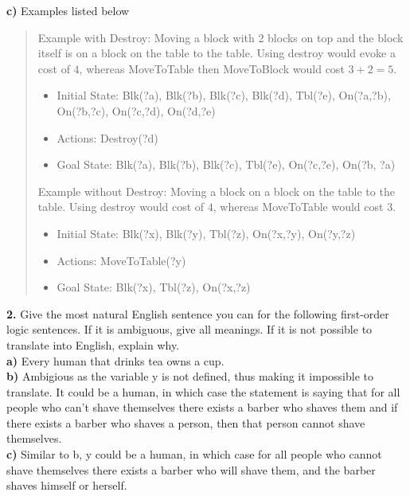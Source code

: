 \documentclass[titlepage]{article}
\begin{document}
\newpage

\textbf{c) } Examples listed below

\begin{quote}
	Example with Destroy: Moving a block with 2 blocks on top and the block itself is on a block on the table to the table. Using destroy would evoke a cost of $4$, whereas MoveToTable then MoveToBlock would cost $3+2=5$.
	\begin{itemize}
		\item Initial State: Blk(?a), Blk(?b), Blk(?c), Blk(?d), Tbl(?e), On(?a,?b), On(?b,?c), On(?c,?d), On(?d,?e)
		\item Actions: Destroy(?d)
		\item Goal State: Blk(?a), Blk(?b), Blk(?c), Tbl(?e), On(?c,?e), On(?b, ?a)
	\end{itemize}

	Example without Destroy: Moving a block on a block on the table to the table. Using destroy would cost of $4$, whereas MoveToTable would cost $3$.
	\begin{itemize}
		\item Initial State: Blk(?x), Blk(?y), Tbl(?z), On(?x,?y), On(?y,?z)
		\item Actions: MoveToTable(?y)
		\item Goal State: Blk(?x), Tbl(?z), On(?x,?z)
	\end{itemize}
\end{quote}

\noindent \textbf{2. } Give the most natural English sentence you can for the following first-order logic sentences. If it is ambiguous, give all meanings. If it is not possible to translate into English, explain why.\\

\textbf{a) } Every human that drinks tea owns a cup.\\

\textbf{b) } Ambigious as the variable y is not defined, thus making it impossible to translate. It could be a human, in which case the statement is saying that for all people who can't shave themselves there exists a barber who shaves them and if there exists a barber who shaves a person, then that person cannot shave themselves.\\

\textbf{c) } Similar to b, y could be a human, in which case for all people who cannot shave themselves there exists a barber who will shave them, and the barber shaves himself or herself.\\
\end{document}
